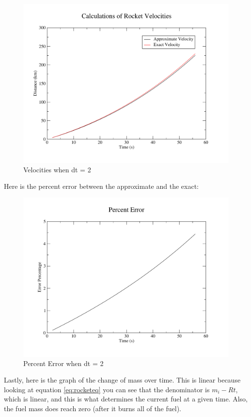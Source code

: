 \documentclass[11pt]{article}
\begin{document}
\begin{figure}[H]
\centering
\includegraphics[scale=0.45]{velocity2.pdf}
\caption{Velocities when dt = 2}
\end{figure}
\newpage
Here is the percent error between the approximate and the exact:
\begin{figure}[H]
\centering
\includegraphics[scale=0.45]{error.pdf}
\caption{Percent Error when dt = 2}
\end{figure}
\newpage
Lastly, here is the graph of the change of mass over time. This is linear because looking at equation \eqref{eq:rocketeq} you can see that the denominator is $m_i - Rt$, which is linear, and this is what determines the current fuel at a given time. Also, the fuel mass does reach zero (after it burns all of the fuel).
\end{document}
